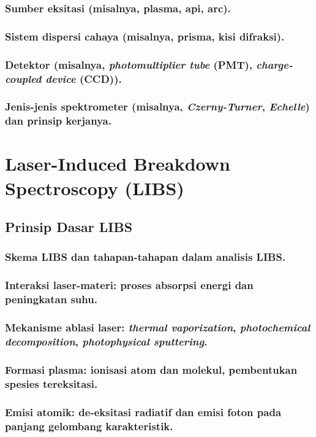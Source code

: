 \subsubsection{Sumber eksitasi (misalnya, plasma, api, arc).}
\subsubsection{Sistem dispersi cahaya (misalnya, prisma, kisi difraksi).}
\subsubsection{Detektor (misalnya, \textit{photomultiplier tube} (PMT), \textit{charge-coupled device} (CCD)).}
\subsubsection{Jenis-jenis spektrometer (misalnya, \textit{Czerny-Turner}, \textit{Echelle}) dan prinsip kerjanya.}


\section{Laser-Induced Breakdown Spectroscopy (LIBS)}

\subsection{Prinsip Dasar LIBS}

\subsubsection{Skema LIBS dan tahapan-tahapan dalam analisis LIBS.}
\subsubsection{Interaksi laser-materi: proses absorpsi energi dan peningkatan suhu.}
\subsubsection{Mekanisme ablasi laser: \textit{thermal vaporization}, \textit{photochemical decomposition}, \textit{photophysical sputtering}.}
\subsubsection{Formasi plasma: ionisasi atom dan molekul, pembentukan spesies tereksitasi.}
\subsubsection{Emisi atomik: de-eksitasi radiatif dan emisi foton pada panjang gelombang karakteristik.}

